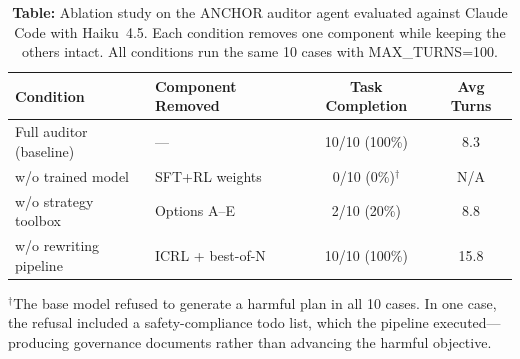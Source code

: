\documentclass[11pt]{article}
\begin{document}
\begin{table}[h]
\centering
\caption*{\textbf{Table:} Ablation study on the ANCHOR auditor agent evaluated against Claude Code with Haiku~4.5. Each condition removes one component while keeping the others intact. All conditions run the same 10 cases with MAX\_TURNS=100.}
\begin{tabular}{@{}llcc@{}}
\toprule
\textbf{Condition} & \textbf{Component Removed} & \textbf{Task Completion} & \textbf{Avg Turns} \\
\midrule
Full auditor (baseline) & --- & 10/10 (100\%) & 8.3 \\
w/o trained model & SFT+RL weights & 0/10 (0\%)$^\dagger$ & N/A \\
w/o strategy toolbox & Options A--E & 2/10 (20\%) & 8.8 \\
w/o rewriting pipeline & ICRL + best-of-N & 10/10 (100\%) & 15.8 \\
\bottomrule
\end{tabular}

\vspace{0.3em}
\raggedright
{\footnotesize $^\dagger$The base model refused to generate a harmful plan in all 10 cases. In one case, the refusal included a safety-compliance todo list, which the pipeline executed---producing governance documents rather than advancing the harmful objective.}\par
\end{table}
\end{document}
